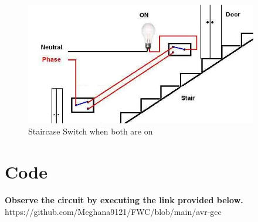 \documentclass[journal,12pt,twocolumn]{IEEEtran}
\begin{document}
\begin{figure}
    \centering
    \includegraphics[width=4in]{Staircase.jpeg}
    \caption{Staircase Switch when both are on}
    \label{fig:circuit}
\end{figure}


\begin{table}[ht]
\centering
{}
\caption{Truth table}
\label{Truth table}
\end{table}
\section{Code}

\textbf{Observe the circuit by executing the link provided below.}\\

https://github.com/Meghana9121/FWC/blob/main/avr-gcc
\end{document}
